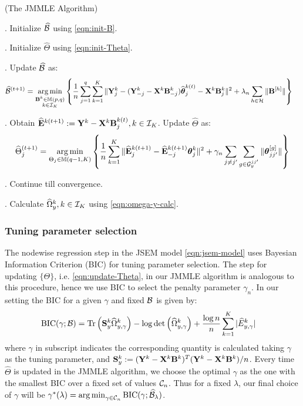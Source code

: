 \begin{Algorithm}
(The JMMLE Algorithm)
\label{algo:jmmle-algo}

. Initialize $\widehat {{\cal{B}}}$ using \eqref{eqn:init-B}.

. Initialize $\widehat \Theta$ using \eqref{eqn:init-Theta}.

. Update $\widehat {{\cal{B}}}$ as:
%
\begin{align}\label{eqn:update-B}
\widehat {{\cal{B}}}^{(t+1)} &= \operatorname*{arg\,min}_{\substack{{\mathbf{B}}^k \in {\mathbb{M}}(p,q)\\k \in {\cal{I}}_K}} \left\{ \frac{1}{n} \sum_{j=1}^q \sum_{k=1}^K \| {\mathbf{Y}}^k_j - ({\mathbf{Y}}_{-j}^k - {\mathbf{X}}^k {\mathbf{B}}_{-j}^k) \widehat {{\boldsymbol{\theta}}}_j^{k (t)} - {\mathbf{X}}^k {\mathbf{B}}_j^{k } \|^2
+ \lambda_n \sum_{h \in {\cal{H}}} \| {\mathbf{B}}^{[h]} \| \right\}
\end{align}

. Obtain $\widehat {{\mathbf{E}}}^{k (t+1)} := {\mathbf{Y}}^k - {\mathbf{X}}^k {\mathbf{B}}_j^{k (t)}, k \in {\cal{I}}_K$. Update $\widehat \Theta$ as:
%
\begin{align}\label{eqn:update-Theta}
\widehat \Theta_j^{(t+1)} = \operatorname*{arg\,min}_{\Theta_j \in {\mathbb{M}}(q-1, K)}
\left\{ \frac{1}{n} \sum_{k=1}^K
\| \widehat {{\mathbf{E}}}_j^{k (t+1)} - \widehat {{\mathbf{E}}}_{-j}^{k (t+1)} {\boldsymbol{\theta}}_j^k \|^2
+ \gamma_n \sum_{j \neq j'} \sum_{g \in {\cal{G}}_y^{jj'}} \| {\boldsymbol{\theta}}_{jj'}^{[g]} \| \right\}
\end{align}

. Continue till convergence.

. Calculate $\widehat \Omega_y^k, k \in {\cal{I}}_K$ using \eqref{eqn:omega-y-calc}.
\end{Algorithm}

\subsubsection{Tuning parameter selection}
The nodewise regression step in the JSEM model \eqref{eqn:jsem-model} uses Bayesian Information Criterion (BIC) for tuning parameter selection. The step for updating $\{ \Theta \}$, i.e. \eqref{eqn:update-Theta}, in our JMMLE algorithm is analogous to this procedure, hence we use BIC to select the penalty parameter $\gamma_n$. In our setting the BIC for a given $\gamma$ and fixed ${\cal{B}}$ is given by:
%
\begin{align*}
\text{BIC} (\gamma; {\cal{B}}) &=
\operatorname*{Tr} \left( {\mathbf{S}}_y^k \widehat \Omega_{y,\gamma}^k \right) - \log \det \left( \widehat \Omega_{y,\gamma}^k \right) +
\frac{\log n}{n} \sum_{k=1}^K | \widehat E_{y,\gamma}^k |
\end{align*}
%
where $\gamma$ in subscript indicates the corresponding quantity is calculated taking $\gamma$ as the tuning parameter, and ${\mathbf{S}}_y^k := ({\mathbf{Y}}^k - {\mathbf{X}}^k {\mathbf{B}}^k)^T ({\mathbf{Y}}^k - {\mathbf{X}}^k {\mathbf{B}}^k)/n$. Every time $\widehat \Theta$ is updated in the JMMLE algorithm, we choose the optimal $\gamma$ as the one with the smallest BIC over a fixed set of values ${\cal{C}}_n$. Thus for a fixed $\lambda$, our final choice of $\gamma$ will be 
$
\gamma^* (\lambda) = \operatorname*{arg\,min}_{\gamma \in {\cal{C}}_n} \text{BIC} (\gamma; \widehat {{\cal{B}}}_\lambda)
$.

